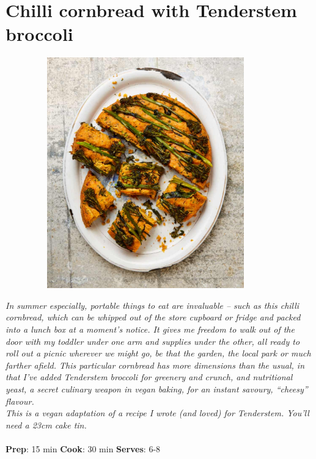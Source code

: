 \documentclass{book}
\begin{document}
\section{Chilli cornbread with Tenderstem broccoli}
\begin{figure}
\centering\includegraphics[width=10cm,height=10cm,keepaspectratio]{Recipe_Pictures/Chilli_cornbread_with_Tenderstem_broccoli.png}
\end{figure}
\emph{In summer especially, portable things to eat are invaluable – such as this chilli cornbread, which can be whipped out of the store cupboard or fridge and packed into a lunch box at a moment’s notice. It gives me freedom to walk out of the door with my toddler under one arm and supplies under the other, all ready to roll out a picnic wherever we might go, be that the garden, the local park or much farther afield. This particular cornbread has more dimensions than the usual, in that I’ve added Tenderstem broccoli for greenery and crunch, and nutritional yeast, a secret culinary weapon in vegan baking, for an instant savoury, “cheesy” flavour.\\ 
This is a vegan adaptation of a recipe I wrote (and loved) for Tenderstem. You’ll need a 23cm cake tin.}\\\\ 
\textbf{Prep}: 15 min
\textbf{Cook}: 30 min
\textbf{Serves}: 6-8
\end{document}
